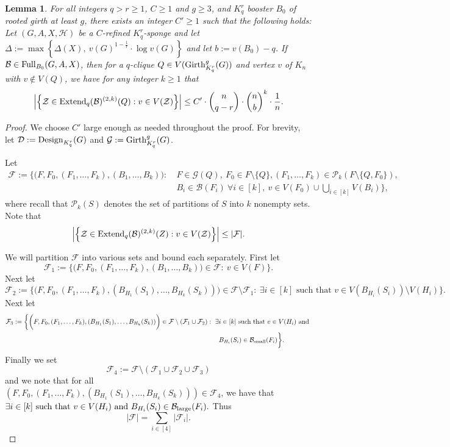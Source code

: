 \documentclass[11pt]{article}
\newcommand{\mc}[1]{\mathcal{#1}}
\newcounter{i}
\theoremstyle{plain}
\newtheorem{lem}[thm]{Lemma}
\renewcommand{\theclaim}{\thetheorem.\arabic{claim}}
\newenvironment{nonlateproof}[1]
 {%
  \renewcommand{\theclaim}{\ref{#1}.\arabic{claim}}%
  \begin{proof}%
 }
 {\end{proof}}
\theoremstyle{plain} %
\theoremstyle{definition}
\begin{document}
\begin{lem}\label{lem:UncommonDegree}
For all integers $q>r\ge 1$, $C\ge 1$ and $g\ge 3$, and $K_q^r$ booster $B_0$ of rooted girth at least $g$, there exists an integer $C'\ge 1$ such that the following holds: Let $(G,A,X,\mc{H})$ be a $C$-refined $K_q^r$-sponge and let $\Delta := \max\left\{ \Delta(X),~v(G)^{1-\frac{1}{r}}\cdot \log v(G)\right\}$ and let $b:= v(B_0)-q$. If $\mc{B} \in {\rm Full}_{B_0}(G,A,X)$, then for a $q$-clique $Q\in V({\rm Girth}_{K_q^r}^g(G))$ and vertex $v$ of $K_n$ with $v\not\in V(Q)$, we have for any integer $k\ge 1$ that
$$\left|\left\{\mc{Z}\in {\rm Extend}_q(\mc{B})^{(2,k)}(Q): v\in V(\mc{Z})\right\}\right| \le C'\cdot \binom{n}{q-r}\cdot \binom{n}{b}^k \cdot \frac{1}{n}.$$
\end{lem}
\begin{nonlateproof}{lem:UncommonDegree}
We choose $C'$ large enough as needed throughout the proof. For brevity, let $\mc{D}:={\rm Design}_{K_q^r}(G)$ and $\mc{G}:= {\rm Girth}_{K_q^r}^g(G)$. 

Let 
\begin{align*}
\mc{F} := \Bigg\{ \bigg(F, F_0, (F_1,\dots, F_k), (B_1,\ldots, B_k)\bigg): 
~&F\in \mc{G}(Q),~F_0\in F\setminus \{Q\}, (F_1,\ldots, F_k)\in \mc{P}_{k}(F\setminus \{Q,F_0\}),\\
~&B_i\in \mc{B}(F_i) ~\forall i\in[k],~v\in V(F_0)\cup \bigcup_{i\in [k]} V(B_i)\Bigg\},    
\end{align*}
where recall that $\mc{P}_k(S)$ denotes the set of partitions of $S$ into $k$ nonempty sets. Note that 
$$\left|\left\{\mc{Z}\in {\rm Extend}_q(\mc{B})^{(2,k)}(Z): v\in V(\mc{Z})\right\}\right| \le |\mc{F}|.$$

We will partition $\mc{F}$ into various sets and bound each separately. First let
$$\mc{F}_1 := \bigg\{ \bigg(F, F_0, (F_1,\dots, F_k), (B_1,\ldots, B_k)\bigg)\in \mc{F}: ~v\in V(F) \bigg\}.$$
Next let 
$$\mc{F}_2 := \bigg\{ \bigg(F, F_0, (F_1,\dots, F_k), (B_{H_1}(S_1),\ldots, B_{H_k}(S_k))\bigg)\in \mc{F}\setminus \mc{F}_1: ~\exists i\in [k] \text{ such that } v\in V\left(B_{H_i}(S_i)\right)\setminus V(H_i) \bigg\}.$$
Next let 
\begin{align*}
\mc{F}_3 := \bigg\{ \bigg(F, F_0, (F_1,\dots, F_k), (B_{H_1}(S_1),\ldots, B_{H_k}(S_k))\bigg)\in \mc{F}\setminus (\mc{F}_1\cup \mc{F}_2): ~\exists &i\in [k] \text{ such that } v\in V(H_i) \text { and }\\
&B_{H_i}(S_i)\in \mc{B}_{\rm small}(F_i) \bigg\}.
\end{align*}
Finally we set
$$\mc{F}_4 := \mc{F}\setminus (\mc{F}_1\cup \mc{F}_2\cup \mc{F}_3)$$
and we note that for all $(F, F_0, (F_1,\dots, F_k), (B_{H_1}(S_1),\ldots, B_{H_k}(S_k)))\in \mc{F}_4$, we have that $\exists i\in [k] \text{ such that } v\in V(H_i) \text { and } B_{H_i}(S_i)\in \mc{B}_{\rm large}(F_i).$
Thus
$$|\mc{F}| = \sum_{i\in [4]} |\mc{F}_i|.$$


\end{nonlateproof}
\end{document}
